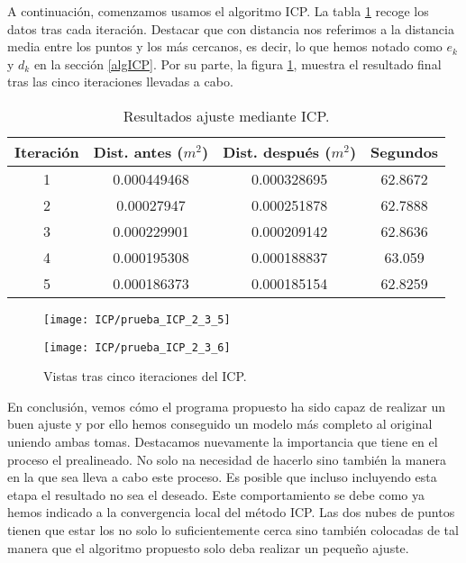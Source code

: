 A continuación, comenzamos usamos el algoritmo ICP. La tabla \ref{table:ICP2} recoge los datos tras cada iteración. Destacar que con distancia nos referimos a la distancia media entre los puntos y los más cercanos, es decir, lo que hemos notado como $ e_k $ y $ d_k $ en la sección \ref{algICP}. Por su parte, la figura \ref{fig:subim2}, muestra el resultado final tras las cinco iteraciones llevadas a cabo. \\

\begin{table}[h!]
	\centering
	\begin{tabular}{| c | c | c | c |} 
		\hline
		Iteración & Dist. antes ($ m^2 $)  & Dist. después ($ m^2 $) & Segundos \\
		\hline
		1 & 0.000449468 & 0.000328695 & 62.8672\\		 
		2 & 0.00027947 &  0.000251878 &  62.7888\\	
		3 & 0.000229901 & 0.000209142  & 62.8636\\
		4 & 0.000195308 &  0.000188837 & 63.059\\
		5 &  0.000186373 &  0.000185154 & 62.8259\\
		\hline
	\end{tabular}
	\caption{Resultados ajuste mediante ICP.}
	\label{table:ICP2}
\end{table}

\begin{figure}[h!]
	
	\begin{minipage}[b]{0.5\textwidth}
		\centering
		\texttt{[image: ICP/prueba\_ICP\_2\_3\_5]} 
	\end{minipage}
	\begin{minipage}[b]{0.5\textwidth}
		\centering
		\texttt{[image: ICP/prueba\_ICP\_2\_3\_6]}
	\end{minipage}
	\caption{Vistas tras cinco iteraciones del ICP.}
	\label{fig:subim2}
\end{figure}
En conclusión, vemos cómo el programa propuesto ha sido capaz de realizar un buen ajuste y por ello hemos conseguido un modelo más completo al original uniendo ambas tomas. Destacamos nuevamente la importancia que tiene en el proceso el prealineado. No solo na necesidad de hacerlo sino también la manera en la que sea lleva a cabo este proceso. Es posible que incluso incluyendo esta etapa el resultado no sea el deseado. Este comportamiento se debe como  ya hemos indicado a la convergencia local del método ICP. Las dos nubes de puntos tienen que estar los no solo lo suficientemente cerca sino también colocadas de tal manera que el algoritmo propuesto solo deba realizar un pequeño ajuste. \\

